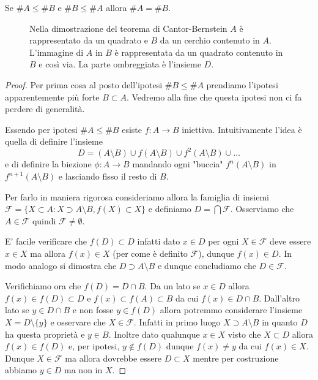 \documentclass[italian,a4paper,hidelinks,headinclude]{scrartcl}
\newcommand{\F}{{\mathcal F}}
\begin{document}
\begin{theorem}
Se $\#A \le \#B$ e $\#B \le \#A$ allora $\#A = \#B$.
\end{theorem}
%
\begin{figure}
  \centering
  
  \caption{
  Nella dimostrazione del teorema di Cantor-Bernstein
  $A$ è rappresentato da un quadrato e $B$ da un cerchio contenuto
  in $A$. L'immagine di $A$ in $B$ è rappresentata da un quadrato contenuto
  in $B$ e così via. La parte ombreggiata è l'insieme $D$.
  }
  \label{fig:omotetia}
\end{figure}
%
\begin{proof}
Per prima cosa al posto dell'ipotesi $\# B \le \#A$ prendiamo
l'ipotesi apparentemente più forte $B\subset A$.
Vedremo alla fine che questa ipotesi non ci fa perdere di generalità.

Essendo per ipotesi $\#A \le \#B$ esiste $f\colon A \to B$ iniettiva.
Intuitivamente l'idea è quella di definire l'insieme
\[
 D = (A\setminus B)  \cup f(A\setminus B) \cup f^2(A\setminus B) \cup \dots
\]
e di definire la biezione $\phi \colon A \to B$ mandando ogni "buccia"
$f^n(A\setminus B)$ in $f^{n+1}(A\setminus B)$ e lasciando fisso
il resto di $B$.

Per farlo in maniera rigorosa
consideriamo allora la famiglia di insiemi $\F = \{X \subset A \colon X \supset A \setminus B, f(X) \subset X\}$ e definiamo $D = \bigcap \F$.
Osserviamo che $A \in \F$ quindi $\F\neq \emptyset$.

E' facile verificare che $f(D) \subset D$ infatti dato $x\in D$ per ogni $X\in \F$ deve essere $x\in X$ ma allora $f(x) \in X$ (per come è definito $\F$), dunque $f(x) \in D$. In modo analogo si dimostra che $D\supset A\setminus B$ e dunque concludiamo che $D\in \F$.

Verifichiamo ora che $f(D)=D\cap B$. Da un lato se $x\in D$ allora
$f(x) \in f(D)\subset D$ e $f(x)\subset f(A)\subset B$ da cui $f(x) \in D\cap B$.
Dall'altro lato se $y\in D \cap B$ e non fosse $y \in f(D)$
allora potremmo considerare l'insieme $X=D\setminus\{y\}$
e osservare che $X\in \F$.
Infatti in primo luogo $X \supset A \setminus B$ in quanto $D$ ha questa proprietà e $y \in B$.
Inoltre dato qualunque $x \in X$ visto che $X\subset D$ allora
$f(x) \in f(D)$ e, per ipotesi,
$y\not \in f(D)$ dunque $f(x)\neq y$ da cui $f(x) \in X$.
Dunque $X\in \F$ ma allora dovrebbe essere $D\subset X$ mentre
per costruzione abbiamo $y\in D$ ma non in $X$.



\end{proof}
\end{document}

